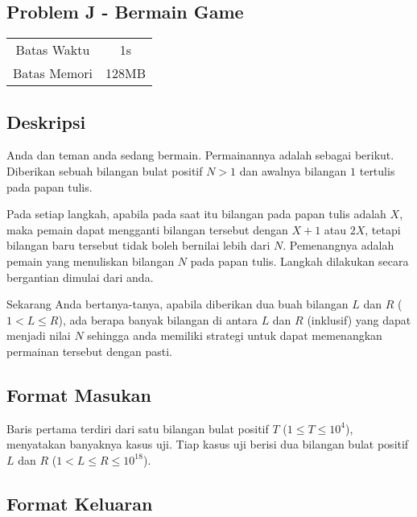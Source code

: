 \documentclass{article}
\begin{document}
\begin{center}
    \section*{Problem J - Bermain Game} %

    \begin{tabular}{ | c c | }
        \hline
        Batas Waktu  & 1s \\    %
        Batas Memori & 128MB \\  %
        \hline
    \end{tabular}
\end{center}

\subsection*{Deskripsi}

Anda dan teman anda sedang bermain. Permainannya adalah sebagai berikut. Diberikan sebuah bilangan bulat positif $N > 1$ dan awalnya bilangan $1$ tertulis pada papan tulis.

Pada setiap langkah, apabila pada saat itu bilangan pada papan tulis adalah $X$, maka pemain dapat mengganti bilangan tersebut dengan $X + 1$ atau $2X$, tetapi bilangan baru tersebut tidak boleh bernilai lebih dari $N$. Pemenangnya adalah pemain yang menuliskan bilangan $N$ pada papan tulis. Langkah dilakukan secara bergantian dimulai dari anda.

Sekarang Anda bertanya-tanya, apabila diberikan dua buah bilangan $L$ dan $R$ ($1 < L \le R$), ada berapa banyak bilangan di antara $L$ dan $R$ (inklusif) yang dapat menjadi nilai $N$ sehingga anda memiliki strategi untuk dapat memenangkan permainan tersebut dengan pasti. 

\subsection*{Format Masukan}

Baris pertama terdiri dari satu bilangan bulat positif $T$ ($1 \leq T \leq 10^4$), menyatakan banyaknya kasus uji.
Tiap kasus uji berisi dua bilangan bulat positif $L$ dan $R$ ($1 < L \leq R \leq 10^{18}$).

\subsection*{Format Keluaran}
\end{document}
